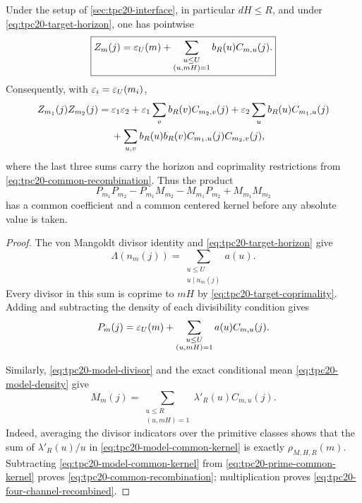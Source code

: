 \begin{theorem}
\label{thm:tpc20-common-recombination}
Under the setup of \cref{sec:tpc20-interface}, in particular
\(dH\le R\), and under \cref{eq:tpc20-target-horizon}, one has
pointwise
\begin{equation}
 \boxed{
 Z_m(j)=\varepsilon_U(m)+
 \sum_{\substack{u\le U\\(u,mH)=1}}
 b_R(u)C_{m,u}(j).}
 \label{eq:tpc20-common-recombination}
\end{equation}
Consequently, with \(\varepsilon_i=\varepsilon_U(m_i)\),
\begin{align}
 Z_{m_1}(j)Z_{m_2}(j)
 ={}&\varepsilon_1\varepsilon_2
 +\varepsilon_1\sum_v b_R(v)C_{m_2,v}(j)
 +\varepsilon_2\sum_u b_R(u)C_{m_1,u}(j)
 \notag\\
 &+\sum_{u,v}b_R(u)b_R(v)
 C_{m_1,u}(j)C_{m_2,v}(j),
 \label{eq:tpc20-four-channel-recombined}
\end{align}
where the last three sums carry the horizon and coprimality restrictions
from \eqref{eq:tpc20-common-recombination}.  Thus the product
\[
 P_{m_1}P_{m_2}-P_{m_1}M_{m_2}
 -M_{m_1}P_{m_2}+M_{m_1}M_{m_2}
\]
has a common coefficient and a common centered kernel before any
absolute value is taken.
\end{theorem}

\begin{proof}
The von Mangoldt divisor identity and
\eqref{eq:tpc20-target-horizon} give
\[
 \Lambda(n_m(j))
 =\sum_{\substack{u\le U\\u\mid n_m(j)}}a(u).
\]
Every divisor in this sum is coprime to \(mH\) by
\eqref{eq:tpc20-target-coprimality}.  Adding and subtracting the density
of each divisibility condition gives
\begin{equation}
 P_m(j)
 =\varepsilon_U(m)+
 \sum_{\substack{u\le U\\(u,mH)=1}}a(u)C_{m,u}(j).
 \label{eq:tpc20-prime-common-kernel}
\end{equation}

Similarly, \eqref{eq:tpc20-model-divisor} and the exact conditional
mean \eqref{eq:tpc20-model-density} give
\begin{equation}
 M_m(j)
 =\sum_{\substack{u\le R\\(u,mH)=1}}
 \lambda'_R(u)C_{m,u}(j).
 \label{eq:tpc20-model-common-kernel}
\end{equation}
Indeed, averaging the divisor indicators over the primitive classes
shows that the sum of \(\lambda'_R(u)/u\) in
\eqref{eq:tpc20-model-common-kernel} is exactly
\(\rho_{M,H,R}(m)\).  Subtracting
\eqref{eq:tpc20-model-common-kernel} from
\eqref{eq:tpc20-prime-common-kernel} proves
\eqref{eq:tpc20-common-recombination}; multiplication proves
\eqref{eq:tpc20-four-channel-recombined}.
\end{proof}

